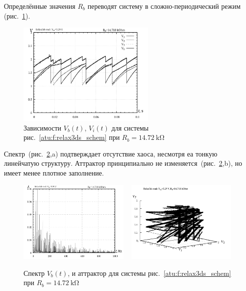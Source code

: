 Определённые значения $R_b$ переводят систему в сложно-периодический режим
(рис.~\ref{atu:f:relax3ds_t_14718}).

\begin{figure}[htb!]
  \centerline{\includegraphics[width=0.6\textwidth]{p/relax3ds_t_014718.png} }
  \caption{Зависимости $V_b(t)$, $V_i(t)$ для системы рис.~\ref{atu:f:relax3ds_schem} при $R_b=\SI{14.72}{\kilo\ohm}$ }
  \label{atu:f:relax3ds_t_14718}
\end{figure}

Спектр~(рис.~\ref{atu:f:relax3ds_f_14718},a)
подтверждает отсутствие хаоса,
несмотря еа тонкую линейчатую структуру.
Аттрактор принципиально не изменяется~(рис.~\ref{atu:f:relax3ds_f_14718},b),
но имеет менее плотное заполнение.

\begin{figure}[htb!]
  \centerline{
    \includegraphics[width=0.48\textwidth]{p/relax3ds_f_014718.png}
    ~
    \includegraphics[width=0.48\textwidth]{p/relax3ds_v1v2v3_014718.png}
  }
  \caption{Спектр $V_b(t)$, и аттрактор для системы рис.~\ref{atu:f:relax3ds_schem} при $R_b=\SI{14.72}{\kilo\ohm}$ }
  \label{atu:f:relax3ds_f_14718}
\end{figure}

